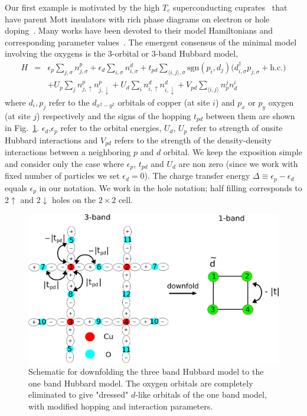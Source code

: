 Our first example is motivated by the high $T_c$ superconducting cuprates~\cite{Bednorz1986} that 
have parent Mott insulators with rich phase diagrams on electron or hole doping~\cite{Dagotto_RevModPhys, LeeWen_RevModPhys}. 
Many works have been devoted to their model Hamiltonians and corresponding parameter 
values~\cite{Emery, ZhangRice, tJSpalek, Hybertsen_PRB1989, Hybertsen_PRB1990, Pavirini, Kent_Hubbard}. 
The emergent consensus of the minimal model involving the oxygens is the 3-orbital or 3-band Hubbard model, 
\begin{eqnarray}
H &=&    \epsilon_p \sum_{j,\sigma} n^{p}_{j,\sigma} + \epsilon_{d} \sum_{i,\sigma}  n^{d}_{i,\sigma} 
	+ t_{pd} \sum_{\langle i,j \rangle, \sigma} \text{sgn}(p_i,d_j) \Big( d_{i,\sigma}^{\dagger} p_{j,\sigma} + \text{h.c.} \Big) \nonumber \\
  & &   + U_p \sum_{j} n^{p}_{j,\uparrow} n^{p}_{j,\downarrow} + U_d \sum_{i} n^{d}_{i,\uparrow} n^{d}_{i,\downarrow} + V_{pd} \sum_{\langle i,j \rangle} n^{j}_p n^{i}_d 
\end{eqnarray}
where $d_i,p_j$ refer to the  $d_{x^2 - y^2}$ orbitals of copper (at site $i$) and $p_x$ or $p_y$ 
oxygen (at site $j$)  respectively and the signs of the hopping $t_{pd}$ between them are shown in Fig.~\ref{fig:threeband}. 
$\epsilon_d$,$\epsilon_p$ refer to the orbital energies, 
$U_d$, $U_p$ refer to strength of onsite Hubbard interactions and $V_{pd}$ refers to the 
strength of the density-density interactions between a neighboring $p$ and $d$ orbital. 
We keep the exposition simple and consider only the case where $\epsilon_p$, $t_{pd}$ and $U_{d}$ are non zero
(since we work with fixed number of particles we set $\epsilon_d = 0$). 
The charge transfer energy $\Delta \equiv \epsilon_p - \epsilon_d$ equals $\epsilon_p$ in our notation. 
We work in the hole notation; half filling corresponds to 2$\uparrow$ and 2$\downarrow$ 
holes on the $2\times2$ cell.

\begin{figure}[htpb]
\centering
\includegraphics[width=0.8\linewidth]{./Figures/three_band_figure.pdf}
\caption{Schematic for downfolding the three band Hubbard model to the one band Hubbard model. 
The oxygen orbitals are completely eliminated to give "dressed" $d$-like orbitals of the one band model, with modified hopping 
and interaction parameters.}
\label{fig:threeband} 
\end{figure}	

